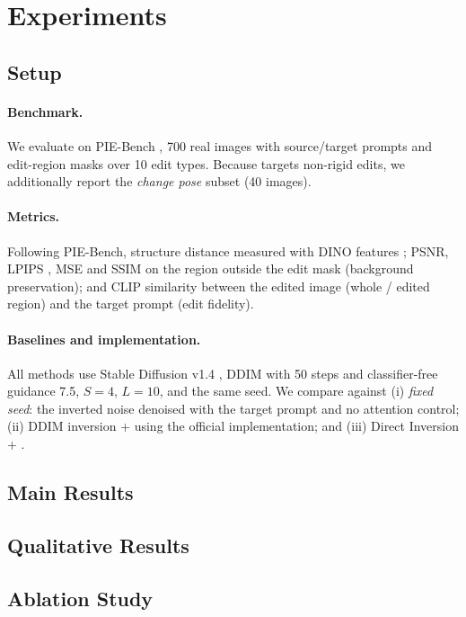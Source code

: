 \section{Experiments}
\label{sec:experiments}

\subsection{Setup}
\paragraph{Benchmark.} We evaluate on PIE-Bench \citep{ju2024pnpinversion}, 700 real images with source/target
prompts and edit-region masks over 10 edit types. Because \method{} targets non-rigid edits, we additionally
report the \emph{change pose} subset (40 images).

\paragraph{Metrics.} Following PIE-Bench, structure distance \citep{tumanyan2022splicing} measured with DINO
features \citep{caron2021dino}; PSNR, LPIPS \citep{zhang2018lpips}, MSE and SSIM on the region outside the
edit mask (background preservation); and CLIP similarity \citep{radford2021clip} between the edited image
(whole / edited region) and the target prompt (edit fidelity).

\paragraph{Baselines and implementation.} All methods use Stable Diffusion v1.4 \citep{rombach2022ldm},
DDIM with 50 steps and classifier-free guidance 7.5, $S=4$, $L=10$, and the same seed.
We compare against (i) \emph{fixed seed}: the inverted noise denoised with the target prompt and no attention
control; (ii) DDIM inversion + \method{} using the official implementation; and (iii) Direct Inversion
\citep{ju2024pnpinversion} + \method{}. 

\subsection{Main Results}


\subsection{Qualitative Results}

\subsection{Ablation Study}
